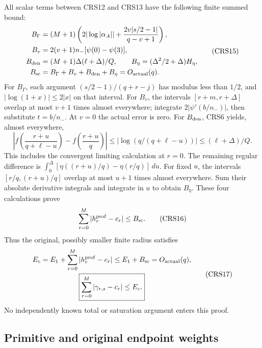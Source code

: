 \documentclass[11pt,a4paper]{article}
\begin{document}
All scalar terms between CRS12 and CRS13 have the following
finite summed bound:
\[
\begin{split}
 B_\Gamma&=(M+1)
 \left(2|\log|\alpha_A||+\frac{2v|s/2-1|}{q-v+1}\right),\\
 B_v&=2(v+1)n_-[\psi(0)-\psi(3)],\\
 B_{\rm den}&=(M+1)\Delta(\ell+\Delta)/Q,\qquad
 B_\eta=(\Delta^2/2+\Delta)H_\eta,\\
 B_{\rm sc}&=B_\Gamma+B_v+B_{\rm den}+B_\eta
                                      =O_{\rm actual}(q).
\end{split}                                                    \tag{CRS15}
\]
For $B_\Gamma$, each argument $(s/2-1)/(q+r-j)$ has modulus
less than $1/2$, and $|\log(1+x)|\le2|x|$ on that interval.
For $B_v$, the intervals $[r+m,r+\Delta]$ overlap at most
$v+1$ times almost everywhere; integrate $2|\psi'(b/n_-)|$,
then substitute $t=b/n_-$. At $v=0$ the actual error is zero.
For $B_{\rm den}$, CRS6 yields, almost everywhere,
\[
 \left|f\left(\frac{r+u}{q+\ell-u}\right)
                    -f\left(\frac{r+u}{q}\right)\right|
 \le|\log(q/(q+\ell-u))|\le(\ell+\Delta)/Q .
\]
This includes the convergent limiting calculation at $r=0$.
The remaining regular difference is
$\int_0^\Delta[\eta((r+u)/q)-\eta(r/q)]\,du$.
For fixed $u$, the intervals $[r/q,(r+u)/q]$ overlap at most
$u+1$ times almost everywhere. Sum their absolute derivative
integrals and integrate in $u$ to obtain $B_\eta$.
These four calculations prove
\[
 \sum_{r=0}^M|h_r^{\rm prof}-c_r|\le B_{\rm sc}.        \tag{CRS16}
\]
Thus the original, possibly smaller finite radius satisfies
\[
\begin{gathered}
 E_c=E_1+\sum_{r=0}^M|h_r^{\rm prof}-c_r|
                 \le E_1+B_{\rm sc}=O_{\rm actual}(q),\\
 \boxed{\displaystyle\sum_{r=0}^M|\gamma_{r,s}-c_r|\le E_c.}
\end{gathered}                                                   \tag{CRS17}
\]
No independently known total or saturation argument enters this proof.

\subsection{Primitive and original endpoint weights}
\end{document}
